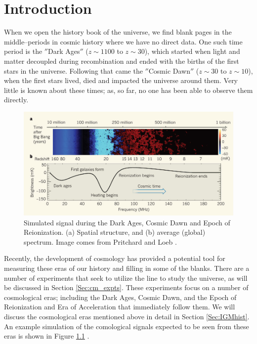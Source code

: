 \chapter{Introduction}\label{Ch:Intro}
When we open the history book of the universe, we find blank pages in the middle--periods in cosmic history where we have no direct data. One such time period is the $''$Dark Ages$''$ ($z \sim 1100$ to $z \sim 30$), which started when light and matter decoupled during recombination and ended with the births of the first stars in the universe. Following that came the $''$Cosmic Dawn$''$ ($z\sim 30$ to $z\sim 10$), when the first stars lived, died and impacted the universe around them. Very little is known about these times; as, so far, no one has been able to observe them directly. 

\begin{figure}[htb]
\begin{center}
\includegraphics[width=0.95\linewidth]{Introduction/figures/pritchard_and_loeb_spectrum.jpg}
\caption{Simulated \cm signal during the Dark Ages, Cosmic Dawn and Epoch of Reionization. (a) Spatial structure, and (b) average (global) spectrum. Image comes from Pritchard and Loeb \cite{pritchard_2010}. }
\label{Fig:cm_hist}
\end{center}
\end{figure}

Recently, the development of \cm cosmology has provided a potential tool for measuring these eras of our history and filling in some of the blanks. There are a number of experiments that seek to utilize the \cm line to study the universe, as will be discussed in Section \ref{Sec:cm_expts}. These experiments focus on a number of cosmological eras; including the Dark Ages, Cosmic Dawn, and the Epoch of Reionization and Era of Acceleration that immediately follow them. We will discuss the cosmological eras mentioned above in detail in Section \ref{Sec:IGMhist}. An example simulation of the \cm comological signals expected to be seen from these eras is shown in Figure \ref{Fig:cm_hist} \cite{pritchard_2010}. 

